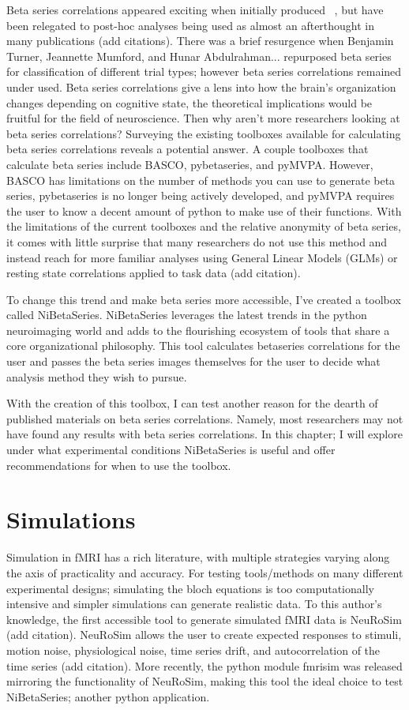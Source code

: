 \documentclass[phd,appendix,figures]{uithesis}
\begin{document}
Beta series correlations appeared exciting when initially produced ~\citep{Rissman2004},
but have been relegated to post-hoc analyses being used as almost an afterthought in many
publications (add citations).
There was a brief resurgence when Benjamin Turner, Jeannette Mumford, and Hunar Abdulrahman... repurposed
beta series for classification of different trial types; however beta series correlations
remained under used.
Beta series correlations give a lens into how the brain's organization changes depending
on cognitive state, the theoretical implications would be fruitful for the field of neuroscience.
Then why aren't more researchers looking at beta series correlations?
Surveying the existing toolboxes available for calculating beta series correlations reveals a
potential answer.
A couple toolboxes that calculate beta series include BASCO, pybetaseries, and pyMVPA.
However, BASCO has limitations on the number of methods you can use to generate beta series,
pybetaseries is no longer being actively developed, and pyMVPA requires the user to know
a decent amount of python to make use of their functions.
With the limitations of the current toolboxes and the relative anonymity of beta series,
it comes with little surprise that many researchers do not use this method and instead reach for
more familiar analyses using General Linear Models (GLMs) or resting state correlations applied
to task data (add citation).

To change this trend and make beta series more accessible, I've created a toolbox called NiBetaSeries.
NiBetaSeries leverages the latest trends in the python neuroimaging world and adds to the flourishing
ecosystem of tools that share a core organizational philosophy.
This tool calculates betaseries correlations for the user and passes the beta series images themselves
for the user to decide what analysis method they wish to pursue.

With the creation of this toolbox, I can test another reason for the dearth of published materials on
beta series correlations.
Namely, most researchers may not have found any results with beta series correlations.
In this chapter; I will explore under what experimental conditions NiBetaSeries is useful and offer
recommendations for when to use the toolbox.

\section{Simulations}
Simulation in fMRI has a rich literature, with multiple strategies varying along the axis
of practicality and accuracy.
For testing tools/methods on many different experimental designs; simulating the bloch equations
is too computationally intensive and simpler simulations can generate realistic data.
To this author's knowledge, the first accessible tool to generate simulated fMRI data is NeuRoSim (add citation).
NeuRoSim allows the user to create expected responses to stimuli, motion noise, physiological noise,
time series drift, and autocorrelation of the time series (add citation).
More recently, the python module fmrisim was released mirroring the functionality of NeuRoSim, making this tool
the ideal choice to test NiBetaSeries; another python application.
\end{document}
